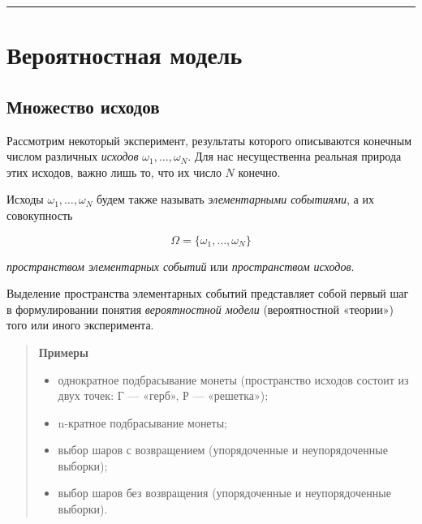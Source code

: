 \documentclass[11pt,a4paper]{article}
\renewcommand{\linethickness}{0.1ex}
\providecommand{\tightlist}{%
      \setlength{\itemsep}{0pt}\setlength{\parskip}{0pt}}
\begin{document}
    \begin{center}\rule{0.5\linewidth}{\linethickness}\end{center}

    \hypertarget{ux432ux435ux440ux43eux44fux442ux43dux43eux441ux442ux43dux430ux44f-ux43cux43eux434ux435ux43bux44c}{%
\section{Вероятностная
модель}\label{ux432ux435ux440ux43eux44fux442ux43dux43eux441ux442ux43dux430ux44f-ux43cux43eux434ux435ux43bux44c}}

    \hypertarget{ux43cux43dux43eux436ux435ux441ux442ux432ux43e-ux438ux441ux445ux43eux434ux43eux432}{%
\subsection{Множество
исходов}\label{ux43cux43dux43eux436ux435ux441ux442ux432ux43e-ux438ux441ux445ux43eux434ux43eux432}}

Рассмотрим некоторый эксперимент, результаты которого описываются
конечным числом различных \emph{исходов} \(\omega_1, \dots , \omega_N\).
Для нас несущественна реальная природа этих исходов, важно лишь то, что
их число \(N\) конечно.

Исходы \(\omega_1, \dots , \omega_N\) будем также называть
\emph{элементарными событиями}, а их совокупность

\[ \Omega = \{ \omega_1, \dots , \omega_N \} \]

\emph{пространством элементарных событий} или \emph{пространством
исходов}.

Выделение пространства элементарных событий представляет собой первый
шаг в формулировании понятия \emph{вероятностной модели} (вероятностной
«теории») того или иного эксперимента.

    \begin{quote}
\textbf{Примеры}

\begin{itemize}
\tightlist
\item
  однократное подбрасывание монеты (пространство исходов состоит из двух
  точек: Г --- «герб», Р --- «решетка»);
\item
  n-кратное подбрасывание монеты;
\item
  выбор шаров с возвращением (упорядоченные и неупорядоченные выборки);
\item
  выбор шаров без возвращения (упорядоченные и неупорядоченные выборки).
\end{itemize}
\end{quote}
\end{document}
